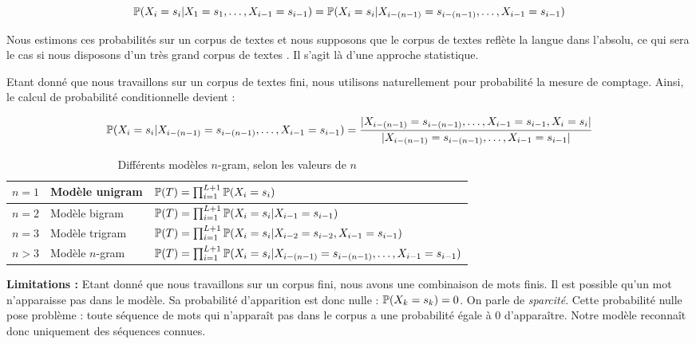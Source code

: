 \[ \P(X_i=s_i \vert X_1=s_1,\ldots, X_{i-1}=s_{i-1}) = \P(X_i=s_i \vert X_{i-(n-1)}=s_{i-(n-1)},\ldots, X_{i-1}=s_{i-1}) \]

Nous estimons ces probabilités sur un corpus de textes et nous supposons que le corpus de textes reflète la langue dans l'absolu,
ce qui sera le cas si nous disposons d'un très grand corpus de textes . Il s'agit là d'une approche statistique.

Etant donné que nous travaillons sur un corpus de textes fini, nous utilisons naturellement pour probabilité la mesure de comptage. Ainsi, le calcul de probabilité conditionnelle devient :

\[ \P(X_i = s_i\vert X_{i-(n-1)} = s_{i-(n-1)}, \ldots, X_{i-1} = s_{i-1}) = \frac{\vert X_{i-(n-1)} = s_{i-(n-1)}, \ldots, X_{i-1} = s_{i-1}, X_i = s_i\vert}{\vert X_{i-(n-1)} = s_{i-(n-1)},\ldots, X_{i-1} = s_{i-1}\vert} \]

\vspace{0.4cm}

\begin{table}[h!]
  \begin{center}
    \begin{tabular}{|l|l|l|}
    \hline
    $n=1$ & Modèle unigram & $\P(T) = \prod_{i=1}^{L+1} \P(X_i = s_i)$ \\
    \hline
    $n=2$ & Modèle bigram & $\P(T) = \prod_{i=1}^{L+1} \P(X_i = s_i\vert X_{i-1} = s_{i-1})$ \\
    \hline
    $n=3$ & Modèle trigram & $\P(T) = \prod_{i=1}^{L+1} \P(X_i = s_i\vert X_{i-2} = s_{i-2}, X_{i-1} = s_{i-1})$ \\
    \hline
    $n > 3$ & Modèle $n$-gram & $\P(T) = \prod_{i=1}^{L+1} \P(X_i = s_i\vert X_{i-(n-1)} = s_{i-(n-1)}, \ldots, X_{i-1} = s_{i-1})$ \\
    \hline
    \end{tabular}
    \caption{Différents modèles $n$-gram, selon les valeurs de $n$}
  \end{center}
\end{table}


\textbf{Limitations :} Etant donné que nous travaillons sur un corpus fini, nous avons une combinaison de mots finis. Il est possible qu'un mot n'apparaisse pas dans le modèle. Sa probabilité d'apparition est donc nulle : $\P(X_k = s_k) = 0$. On parle de \textit{sparcité}.
Cette probabilité nulle pose problème : toute séquence de mots qui n'apparaît pas dans le corpus a une probabilité égale à 0 d'apparaître.
Notre modèle reconnaît donc uniquement des séquences connues.

